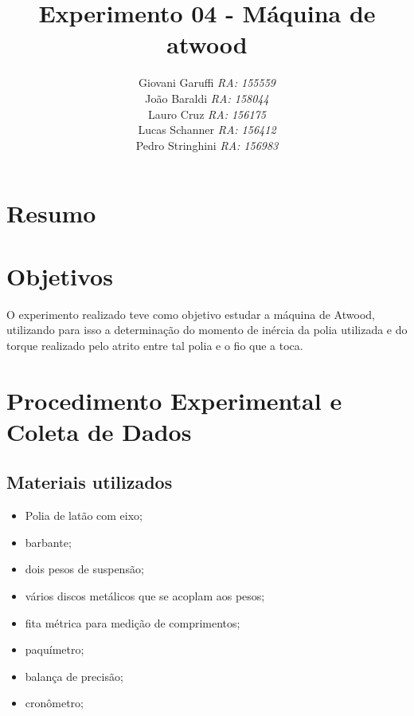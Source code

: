 \documentclass[12pt,a4paper]{article}
\begin{document}
\title{\vspace{70mm}\Huge Experimento 04 - Máquina de atwood}
\author{ Giovani Garuffi\qquad\hfill
		\textit {RA: 155559}\protect\\
		João Baraldi\hfill
		\textit{RA: 158044}\protect\\
		Lauro Cruz\hfill
		\textit{RA: 156175}\protect\\
		Lucas Schanner\hfill
		\textit{RA: 156412}\protect\\
		Pedro Stringhini\hfill
		\textit {RA: 156983}								
		}
\maketitle
\newpage
\section{Resumo}

\section{Objetivos}
O experimento realizado teve como objetivo estudar a máquina de Atwood, utilizando para isso a determinação do momento de inércia da polia utilizada e do torque realizado pelo atrito entre tal polia e o fio que a toca.


\section{Procedimento Experimental e Coleta de Dados}

\subsection{Materiais utilizados}

\begin{itemize}
	\item Polia de latão com eixo;
	\item barbante;
	\item dois pesos de suspensão;
	\item vários discos metálicos que se acoplam aos pesos;
	\item fita métrica para medição de comprimentos;
	\item paquímetro;
	\item balança de precisão;
	\item cronômetro;
\end{itemize}
\end{document}
